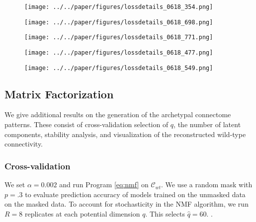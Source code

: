 \begin{figure}[H]
    \centering
    \texttt{[image: ../../paper/figures/lossdetails\_0618\_354.png]} 
    \label{fig:distances}
    \caption{}
\end{figure}

\begin{figure}[H]
    \centering
    \texttt{[image: ../../paper/figures/lossdetails\_0618\_698.png]} 
    \label{fig:distances}
    \caption{}
\end{figure}

\begin{figure}[H]
    \centering
    \texttt{[image: ../../paper/figures/lossdetails\_0618\_771.png]} 
    \label{fig:distances}
    \caption{}
\end{figure}

\begin{figure}[H]
    \centering
    \texttt{[image: ../../paper/figures/lossdetails\_0618\_477.png]} 
    \label{fig:distances}
    \caption{}
\end{figure}

\begin{figure}[H]
    \centering
    \texttt{[image: ../../paper/figures/lossdetails\_0618\_549.png]} 
    \label{fig:distances}
    \caption{}
\end{figure}

\newpage

\subsection{Matrix Factorization}
\label{supp_sec:matrix_factor_results}

We give additional results on the generation of the archetypal connectome patterns.
These consist of cross-validation selection of $q$, the number of latent components, stability analysis, and visualization of the reconstructed wild-type connectivity.

\subsubsection{Cross-validation}

We set $\alpha = 0.002$ and run Program \ref{eq:nmf} on $\mathcal C_{wt}$.
We use a random mask with $p = .3$ to evaluate prediction accuracy of models trained on the unmasked data on the masked data.
To account for stochasticity in the NMF algorithm, we run $R = 8$ replicates at each potential dimension $q$.
This selects $\hat q = 60$.
.

